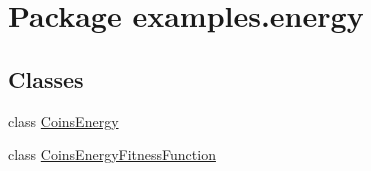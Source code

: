 \hypertarget{namespaceexamples_1_1energy}{\section{Package examples.\-energy}
\label{namespaceexamples_1_1energy}
}
\subsection*{Classes}
\begin{DoxyCompactItemize}
\item 
class \hyperlink{classexamples_1_1energy_1_1_coins_energy}{Coins\-Energy}
\item 
class \hyperlink{classexamples_1_1energy_1_1_coins_energy_fitness_function}{Coins\-Energy\-Fitness\-Function}
\end{DoxyCompactItemize}

